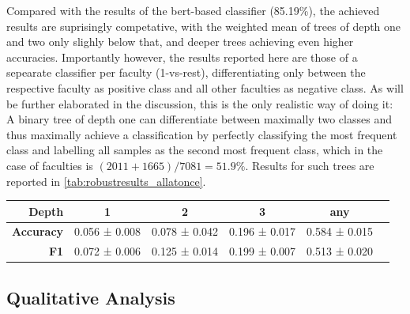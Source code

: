 Compared with the results of the \gls{bert}-based classifier (85.19\%), the achieved results are suprisingly competative, with the weighted mean of trees of depth one and two only slighly below that, and deeper trees achieving even higher accuracies. 
Importantly however, the results reported here are those of a sepearate classifier per faculty (1-vs-rest), differentiating only between the respective faculty as positive class and all other faculties as negative class. As will be further elaborated in the discussion, this is the only realistic way of doing it: A binary tree of depth one can differentiate between maximally two classes and thus maximally achieve a classification by perfectly classifying the most frequent class and labelling all samples as the second most frequent class, which in the case of faculties is $(2011+1665)/7081=51.9\%$. Results for such trees are reported in \autoref{tab:robustresults_allatonce}.

\begin{table}[H]
	\begin{tabular}{rccccc}
		\toprule
		\textbf{Depth} &  \textbf{1} & \textbf{2} & \textbf{3} & \textbf{any} \\
		\midrule
		\textbf{Accuracy} & 0.056 ± 0.008 & 0.078 ± 0.042 & 0.196 ± 0.017 & 0.584 ± 0.015 \\
		\textbf{F1}       & 0.072 ± 0.006 & 0.125 ± 0.014 & 0.199 ± 0.007 & 0.513 ± 0.020 \\
		\bottomrule
	\end{tabular}
	\label{tab:robustresults_allatonce}
\end{table}


\subsection{Qualitative Analysis}

